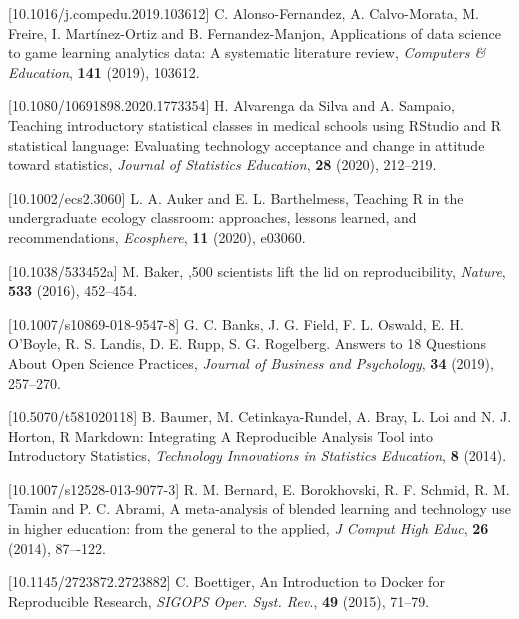 \documentclass{aims}
\theoremstyle{definition}
\begin{document}
\begin{thebibliography}{99}

 [10.1016/j.compedu.2019.103612]
     \newblock  C. Alonso-Fernandez,  A. Calvo-Morata, M. Freire, I. Martínez-Ortiz and B. Fernandez-Manjon,
     \newblock Applications of data science to game learning analytics data: A systematic literature review,
     \newblock \emph{Computers \& Education}, \textbf{141} (2019), 103612.

 [10.1080/10691898.2020.1773354]
     \newblock  H. Alvarenga da Silva and A. Sampaio,
     \newblock Teaching introductory statistical classes in medical schools using RStudio and R statistical language: Evaluating technology acceptance and change in attitude toward statistics,
     \newblock \emph{Journal of Statistics Education}, \textbf{28} (2020), 212--219.

 [10.1002/ecs2.3060]
     \newblock  L. A. Auker and E. L. Barthelmess,
     \newblock Teaching R in the undergraduate ecology classroom: approaches, lessons learned, and recommendations,
     \newblock \emph{Ecosphere}, \textbf{11} (2020), e03060.

 [10.1038/533452a]
     \newblock  M. Baker,
     ,500 scientists lift the lid on reproducibility,
     \newblock \emph{Nature}, \textbf{533} (2016), 452--454.

 [10.1007/s10869-018-9547-8]
     \newblock  G. C. Banks, J. G. Field, F. L. Oswald, E. H. O'Boyle, R. S. Landis, D. E. Rupp, S. G. Rogelberg.
     \newblock Answers to 18 Questions About Open Science Practices,
     \newblock \emph{Journal of Business and Psychology}, \textbf{34} (2019), 257--270.

 [10.5070/t581020118]
     \newblock B. Baumer, M. Cetinkaya-Rundel, A. Bray, L. Loi and N. J. Horton,
     \newblock R Markdown: Integrating A Reproducible Analysis Tool into Introductory Statistics,
     \newblock \emph{Technology Innovations in Statistics Education}, \textbf{8} (2014).

 [10.1007/s12528-013-9077-3]
     \newblock  R. M. Bernard, E. Borokhovski, R. F. Schmid, R. M. Tamin and P. C. Abrami,
     \newblock A meta-analysis of blended learning and technology use in higher education: from the general to the applied,
     \newblock \emph{J Comput High Educ}, \textbf{26} (2014), 87–-122.

 [10.1145/2723872.2723882]
     \newblock  C. Boettiger,
     \newblock An Introduction to Docker for Reproducible Research,
     \newblock \emph{SIGOPS Oper. Syst. Rev.}, \textbf{49} (2015), 71--79.


\end{thebibliography}
\end{document}

